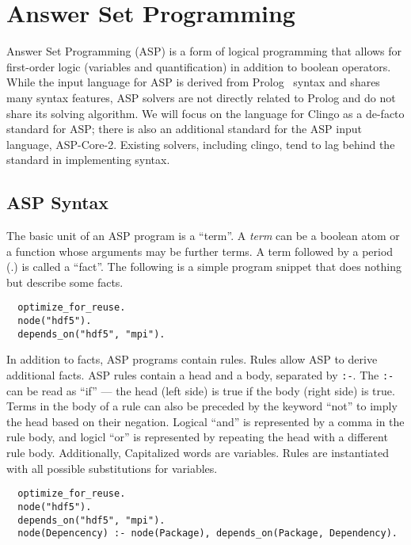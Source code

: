 \section{Answer Set Programming}
\label{sec:asp}

Answer Set Programming (ASP) is a form of logical programming that allows for first-order logic (variables and quantification) in addition to boolean operators.
While the input language for ASP is derived from Prolog~\cite{baral_2003} syntax and shares many syntax features, ASP solvers are not directly related to Prolog and do not share its solving algorithm.
We will focus on the language for Clingo as a de-facto standard for ASP; there is also an additional standard for the ASP input language, ASP-Core-2.
Existing solvers, including clingo, tend to lag behind the standard in implementing syntax.

\subsection{ASP Syntax}

The basic unit of an ASP program is a ``term''.
A \textit{term} can be a boolean atom or a function whose arguments may be further terms.
A term followed by a period (.) is called a ``fact''.
The following is a simple program snippet that does nothing but describe some facts.

\begin{verbatim}
  optimize_for_reuse.
  node("hdf5").
  depends_on("hdf5", "mpi").
\end{verbatim}

In addition to facts, ASP programs contain rules.
Rules allow ASP to derive additional facts.
ASP rules contain a head and a body, separated by \texttt{:-}.
The \texttt{:-} can be read as ``if'' --- the head (left side) is true if the body (right side) is true.
Terms in the body of a rule can also be preceded by the keyword ``not'' to imply the head based on their negation.
Logical ``and'' is represented by a comma in the rule body, and logicl ``or'' is represented by repeating the head with a different rule body.
Additionally, Capitalized words are variables.
Rules are instantiated with all possible substitutions for variables.

\begin{verbatim}
  optimize_for_reuse.
  node("hdf5").
  depends_on("hdf5", "mpi").
  node(Depencency) :- node(Package), depends_on(Package, Dependency).
\end{verbatim}

